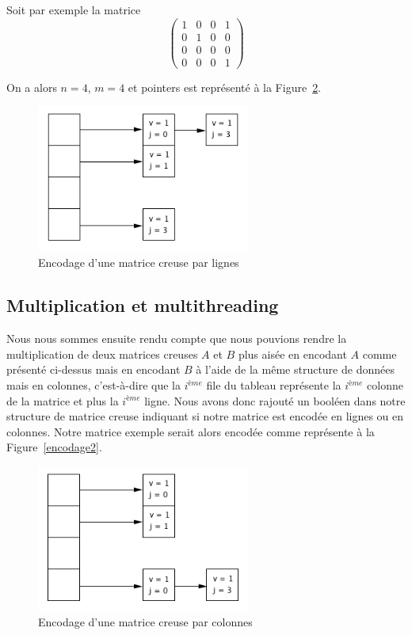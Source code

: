 \documentclass[12pt,a4paper]{article}
\begin{document}
Soit par exemple la matrice
$$\begin{pmatrix}
   1 & 0 & 0 & 1 \\
   0 & 1 & 0 & 0 \\
   0 & 0 & 0 & 0 \\
   0 & 0 & 0 & 1  
\end{pmatrix}$$

On a alors $n = 4$, $m = 4$ et pointers est représenté à la Figure~\ref{encodage}.
\begin{figure}[!h]
	\begin{center}
		\includegraphics[width=7cm]{encodage.png}
		\caption{Encodage d'une matrice creuse par lignes}
		\label{encodage}
	\end{center}
\end{figure}


\subsection{Multiplication et multithreading}
Nous nous sommes ensuite rendu compte que nous pouvions rendre la multiplication de deux matrices creuses $A$ et $B$ plus aisée en encodant $A$ comme présenté ci-dessus mais en encodant $B$ à l'aide de la même structure de données mais en colonnes, c'est-à-dire que la $i^{ème}$ file du tableau représente la $i^{ème}$ colonne de la matrice et plus la $i^{ème}$ ligne. Nous avons donc rajouté un booléen dans notre structure de matrice creuse indiquant si notre matrice est encodée en lignes ou en colonnes. Notre matrice exemple serait alors encodée comme représente à la Figure~\ref{encodage2}.\\

\begin{figure}[!!h]
	\begin{center}
		\includegraphics[width=7cm]{encodage2.png}
		\caption{Encodage d'une matrice creuse par colonnes}
		\label{encodage}
	\end{center}
\end{figure}
\end{document}
